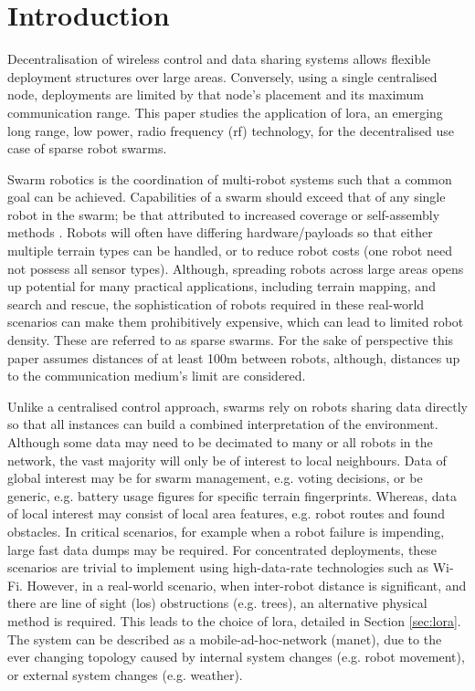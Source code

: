 \chapter{Introduction}
Decentralisation of wireless control and data sharing systems allows flexible deployment structures over large areas. Conversely, using a single centralised node, deployments are limited by that node's placement and its maximum communication range. This paper studies the application of \ac{lora}, an emerging long range, low power, radio frequency (\ac{rf}) technology, for the decentralised use case of sparse robot swarms. 
  
Swarm robotics is the coordination of multi-robot systems such that a common goal can be achieved. Capabilities of a swarm should exceed that of any single robot in the swarm; be that attributed to increased coverage \cite{Ducatelle:2011:Pathfinding} or self-assembly methods \cite{3YP:OBSTACLE_SWARMS}. Robots will often have differing hardware/payloads so that either multiple terrain types can be handled, or to reduce robot costs (one robot need not possess all sensor types). Although, spreading robots across large areas opens up potential for many practical applications, including terrain mapping, and search and rescue, the sophistication of robots required in these real-world scenarios can make them prohibitively expensive, which can lead to limited robot density. These are referred to as sparse swarms. For the sake of perspective this paper assumes distances of at least 100m between robots, although, distances up to the communication medium's limit are considered. 
 
Unlike a centralised control approach, swarms rely on robots sharing data directly so that all instances can build a combined interpretation of the environment. Although some data may need to be decimated to many or all robots in the network, the vast majority will only be of interest to local neighbours. Data of global interest may be for swarm management, e.g. voting decisions, or be generic, e.g. battery usage figures for specific terrain fingerprints. Whereas, data of local interest may consist of local area features, e.g. robot routes and found obstacles. In critical scenarios, for example when a robot failure is impending, large fast data dumps may be required. For concentrated deployments, these scenarios are trivial to implement using high-data-rate technologies such as Wi-Fi. However, in a real-world scenario, when inter-robot distance is significant, and there are line of sight (\ac{los}) obstructions (e.g. trees), an alternative physical method is required. This leads to the choice of \ac{lora}, detailed in Section \ref{sec:lora}. The system can be described as a mobile-ad-hoc-network (\ac{manet}), due to the ever changing topology caused by internal system changes (e.g. robot movement), or external system changes (e.g. weather).


